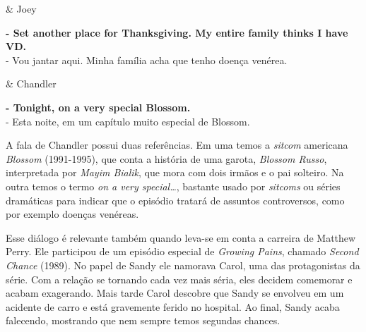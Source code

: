 \begin{tcolorbox}[enhanced,center upper,
    drop fuzzy shadow southeast, boxrule=0.3pt,
    lower separated=false,
    colframe=black!30!dialogoBorder,colback=white]
\begin{minipage}[c]{0.16\linewidth}
   & \centering \scriptsize{Joey}
\end{minipage}
\hfill
\begin{minipage}[c]{0.8\linewidth}
  \textbf{- Set another place for Thanksgiving. My entire family thinks I have VD.}\\
  - Vou jantar aqui. Minha família acha que tenho doença venérea.
\end{minipage}

\medskip
\begin{minipage}[c]{0.16\linewidth}
   & \centering \scriptsize{Chandler}
\end{minipage}
\hfill
\begin{minipage}[c]{0.8\linewidth}
  \textbf{- Tonight, on a very special Blossom.}\\
  - Esta noite, em um capítulo muito especial de Blossom.
\end{minipage}
\end{tcolorbox}

A fala de Chandler possui duas referências. Em uma temos a \emph{sitcom}
americana \emph{Blossom} (1991-1995), que conta a história de uma
garota, \emph{Blossom Russo}, interpretada por \emph{Mayim Bialik}, que
mora com dois irmãos e o pai solteiro. Na outra temos o termo \emph{on a
very special\ldots{}}, bastante usado por \emph{sitcoms} ou séries
dramáticas para indicar que o episódio tratará de assuntos controversos,
como por exemplo doenças venéreas.

Esse diálogo é relevante também quando leva-se em conta a carreira de
Matthew Perry. Ele participou de um episódio especial de \emph{Growing
Pains}, chamado \emph{Second Chance} (1989). No papel de Sandy ele
namorava Carol, uma das protagonistas da série. Com a relação se
tornando cada vez mais séria, eles decidem comemorar e acabam
exagerando. Mais tarde Carol descobre que Sandy se envolveu em um
acidente de carro e está gravemente ferido no hospital. Ao final, Sandy
acaba falecendo, mostrando que nem sempre temos segundas chances.

